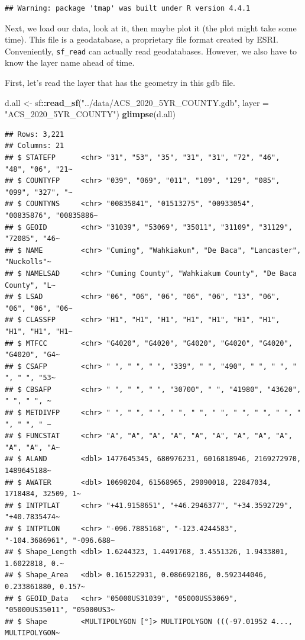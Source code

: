 \documentclass[]{article}
\newenvironment{Shaded}{\begin{snugshade}}{\end{snugshade}}
\newcommand{\AttributeTok}[1]{\textcolor[rgb]{0.13,0.29,0.53}{#1}}
\newcommand{\FunctionTok}[1]{\textcolor[rgb]{0.13,0.29,0.53}{\textbf{#1}}}
\newcommand{\NormalTok}[1]{#1}
\newcommand{\OtherTok}[1]{\textcolor[rgb]{0.56,0.35,0.01}{#1}}
\newcommand{\SpecialCharTok}[1]{\textcolor[rgb]{0.81,0.36,0.00}{\textbf{#1}}}
\newcommand{\StringTok}[1]{\textcolor[rgb]{0.31,0.60,0.02}{#1}}
\begin{document}
\begin{verbatim}
## Warning: package 'tmap' was built under R version 4.4.1
\end{verbatim}

Next, we load our data, look at it, then maybe plot it (the plot might
take some time). This file is a geodatabase, a proprietary file format
created by ESRI. Conveniently, \texttt{sf\_read} can actually read
geodatabases. However, we also have to know the layer name ahead of
time.

First, let's read the layer that has the geometry in this gdb file.

\begin{Shaded}
\begin{Highlighting}[]
\NormalTok{d.all }\OtherTok{\textless{}{-}}\NormalTok{ sf}\SpecialCharTok{::}\FunctionTok{read\_sf}\NormalTok{(}\StringTok{"../data/ACS\_2020\_5YR\_COUNTY.gdb"}\NormalTok{, }\AttributeTok{layer =} \StringTok{"ACS\_2020\_5YR\_COUNTY"}\NormalTok{)}
\FunctionTok{glimpse}\NormalTok{(d.all)}
\end{Highlighting}
\end{Shaded}

\begin{verbatim}
## Rows: 3,221
## Columns: 21
## $ STATEFP      <chr> "31", "53", "35", "31", "31", "72", "46", "48", "06", "21~
## $ COUNTYFP     <chr> "039", "069", "011", "109", "129", "085", "099", "327", "~
## $ COUNTYNS     <chr> "00835841", "01513275", "00933054", "00835876", "00835886~
## $ GEOID        <chr> "31039", "53069", "35011", "31109", "31129", "72085", "46~
## $ NAME         <chr> "Cuming", "Wahkiakum", "De Baca", "Lancaster", "Nuckolls"~
## $ NAMELSAD     <chr> "Cuming County", "Wahkiakum County", "De Baca County", "L~
## $ LSAD         <chr> "06", "06", "06", "06", "06", "13", "06", "06", "06", "06~
## $ CLASSFP      <chr> "H1", "H1", "H1", "H1", "H1", "H1", "H1", "H1", "H1", "H1~
## $ MTFCC        <chr> "G4020", "G4020", "G4020", "G4020", "G4020", "G4020", "G4~
## $ CSAFP        <chr> " ", " ", " ", "339", " ", "490", " ", " ", " ", " ", "53~
## $ CBSAFP       <chr> " ", " ", " ", "30700", " ", "41980", "43620", " ", " ", ~
## $ METDIVFP     <chr> " ", " ", " ", " ", " ", " ", " ", " ", " ", " ", " ", " ~
## $ FUNCSTAT     <chr> "A", "A", "A", "A", "A", "A", "A", "A", "A", "A", "A", "A~
## $ ALAND        <dbl> 1477645345, 680976231, 6016818946, 2169272970, 1489645188~
## $ AWATER       <dbl> 10690204, 61568965, 29090018, 22847034, 1718484, 32509, 1~
## $ INTPTLAT     <chr> "+41.9158651", "+46.2946377", "+34.3592729", "+40.7835474~
## $ INTPTLON     <chr> "-096.7885168", "-123.4244583", "-104.3686961", "-096.688~
## $ Shape_Length <dbl> 1.6244323, 1.4491768, 3.4551326, 1.9433801, 1.6022818, 0.~
## $ Shape_Area   <dbl> 0.161522931, 0.086692186, 0.592344046, 0.233861880, 0.157~
## $ GEOID_Data   <chr> "05000US31039", "05000US53069", "05000US35011", "05000US3~
## $ Shape        <MULTIPOLYGON [°]> MULTIPOLYGON (((-97.01952 4..., MULTIPOLYGON~
\end{verbatim}
\end{document}
